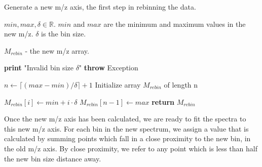 \documentclass[11pt,openany]{book}
\begin{document}
    \begin{algorithm}
    
        \label{alg:rebin1_generate_new_axis}
        \caption{Generate a new m/z axis, the first step in rebinning the data.}
        
        \begin{algorithmic}
           
            \Require $min, max, \delta \in \mathbb{R}$. $min$ and $max$ are the minimum and maximum values in the new m/z. $\delta$ is the bin size.
            
            \Ensure $M_{rebin}$ - the new m/z array.
           
            
                \State \textbf{print} "Invalid bin size $\delta$"
                \State \textbf{throw} Exception
            \EndIf

            \State $n \gets \lceil (max - min) / \delta \rceil + 1$
            \State Initialize array $M_{rebin}$ of length n
            
                \State $M_{rebin}[i] \gets min + i \cdot \delta$
            \EndFor
            \State $M_{rebin}[n-1] \gets max$
            \State \textbf{return} $M_{rebin}$
            \EndProcedure
        \end{algorithmic}
    \end{algorithm}


Once the new m/z axis has been calculated, we are ready to fit the spectra to this new m/z axis. For each bin in the new spectrum, we assign a value that is calculated by summing points which fall in a close proximity to the new bin, in the old m/z axis. By close proximity, we refer to any point which is less than half the new bin size distance away. 
\end{document}
